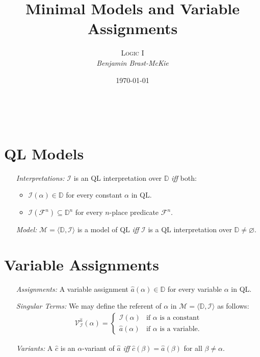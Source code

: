 \documentclass[a4paper, 11pt]{article} %
\title{\textbf{Minimal Models and Variable Assignments}} %
\author{\textsc{Logic I}\\ \em Benjamin Brast-McKie} %
\date{\today} %
\makeatletter
\newcommand{\tuple}[1]{\langle#1\rangle} %
\newcommand{\I}{\mathcal{I}}
\newcommand{\F}{\mathcal{F}}
\newcommand{\M}{\mathcal{M}}
\newcommand{\D}{\mathbb{D}}
\newcommand{\VV}[2]{\mathcal{V}_{#1}^{#2}} %
\renewcommand{\maketitle}{ %
\begin{flushright} %
{\LARGE\@title} %

\vspace{10pt} %

{\@author} %
\\\@date %

\vspace{30pt} %
\end{flushright}
}
\makeatother
\begin{document}
\maketitle %

\thispagestyle{empty}






\section*{QL Models}

\begin{enumerate}
  \item[\it Interpretations:] $\I$ is an QL interpretation over $\D$ \textit{iff} both: 
    \begin{itemize}
      \item $\I(\alpha)\in\D$ for every constant $\alpha$ in QL. 
      \item $\I(\F^n)\subseteq\D^n$ for every $n$-place predicate $\F^n$.
    \end{itemize}
  \item[\it Model:] $\M=\tuple{\D,\I}$ is a model of QL \textit{iff} $\I$ is a QL interpretation over $\D\neq\varnothing$.
\end{enumerate}



\section*{Variable Assignments}

\begin{enumerate}
  \item[\it Assignments:] A variable assignment $\hat{a}(\alpha)\in\D$ for every variable $\alpha$ in QL.
  \item[\it Singular Terms:] We may define the referent of $\alpha$ in $\M=\tuple{\D,\I}$ as follows:\\
    \begin{align*}
      \VV{\I}{\hat{a}}{(\alpha)}=
        \begin{cases}
          \I(\alpha) & \text{if } \alpha \text{ is a constant} \\
          \hat{a}(\alpha) & \text{if } \alpha \text{ is a variable.}
        \end{cases}
    \end{align*}
  \item[\it Variants:] A $\hat{c}$ is an $\alpha$-variant of $\hat{a}$ \textit{iff} $\hat{c}(\beta)=\hat{a}(\beta)$ for all $\beta\neq\alpha$.
\end{enumerate}
\end{document}
